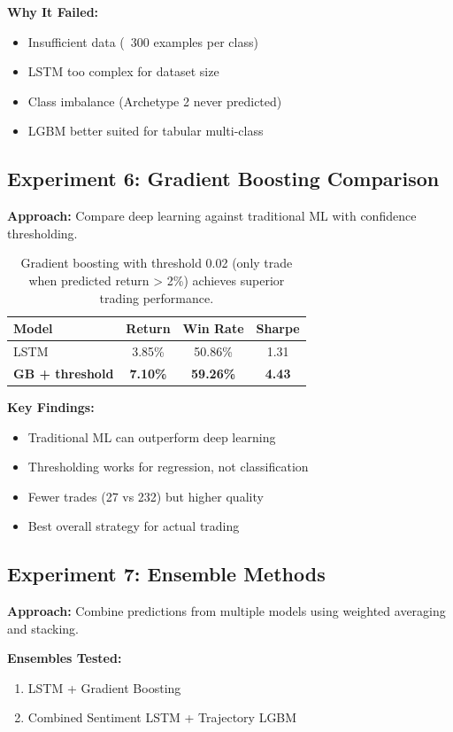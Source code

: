 \documentclass[10pt,twocolumn]{article}
\begin{document}
\textbf{Why It Failed:}
\begin{itemize}
\item Insufficient data (~300 examples per class)
\item LSTM too complex for dataset size
\item Class imbalance (Archetype 2 never predicted)
\item LGBM better suited for tabular multi-class
\end{itemize}

\subsection{Experiment 6: Gradient Boosting Comparison}

\textbf{Approach:} Compare deep learning against traditional ML with confidence thresholding.

\begin{table}[h]
\centering
\small
\begin{tabular}{lccc}
\toprule
Model & Return & Win Rate & Sharpe \\
\midrule
LSTM & 3.85\% & 50.86\% & 1.31 \\
\textbf{GB + threshold} & \textbf{7.10\%} & \textbf{59.26\%} & \textbf{4.43} \\
\bottomrule
\end{tabular}
\caption{Gradient boosting with threshold 0.02 (only trade when predicted return > 2\%) achieves superior trading performance.}
\end{table}

\textbf{Key Findings:}
\begin{itemize}
\item Traditional ML can outperform deep learning
\item Thresholding works for regression, not classification
\item Fewer trades (27 vs 232) but higher quality
\item Best overall strategy for actual trading
\end{itemize}

\subsection{Experiment 7: Ensemble Methods}

\textbf{Approach:} Combine predictions from multiple models using weighted averaging and stacking.

\textbf{Ensembles Tested:}
\begin{enumerate}
\item LSTM + Gradient Boosting
\item Combined Sentiment LSTM + Trajectory LGBM
\end{enumerate}
\end{document}
